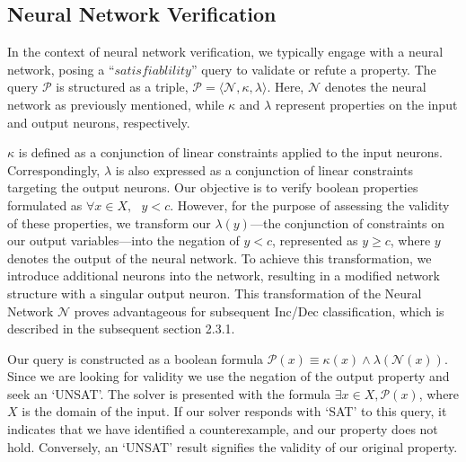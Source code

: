 \subsection{Neural Network Verification }
In the context of neural network verification, we typically engage with a
 neural network, posing a ``$\textit{satisfiablility}$'' query to validate or 
 refute a property. The query \(\mathcal{P}\) is structured as a triple,
  \(\mathcal{P} = \langle \mathcal{N}, \kappa, \lambda \rangle\). Here,
   \(\mathcal{N}\) denotes the neural network as previously mentioned, 
   while \(\kappa\) and \(\lambda\) represent properties on the input and 
   output neurons, respectively. 

$\kappa$ is defined as a conjunction of linear constraints applied to the 
input neurons. Correspondingly, $\lambda$ is also expressed as a conjunction 
of linear constraints targeting the output neurons. Our objective is to verify
boolean properties formulated as $\forall x \in X,\textit{ } y < c$. However, 
for the purpose of assessing the validity of these properties, we transform 
our $\lambda(y)$—the conjunction of constraints on our output variables—into
the negation of $y < c$, represented as $y \geq c$, where $y$ denotes the output 
of the neural network. To achieve this transformation, we introduce additional
neurons into the network, resulting in a modified network structure with a singular
output neuron. This transformation of the Neural Network $\mathcal{N}$ proves 
advantageous for subsequent Inc/Dec classification, which is described in the
subsequent section 2.3.1.

Our query is constructed as a boolean formula 
\(\mathcal{P}(x) \equiv \kappa(x) \land \lambda(\mathcal{N}(x))\). 
Since we are looking for validity we use the negation of the output 
property and seek an `UNSAT'. The solver is presented with the formula 
\(\exists x \in X, \mathcal{P}(x)\), where \(X\) is the domain of the input. 
If our solver responds with `SAT' to this query, it indicates that we have 
identified a counterexample, and our property does not hold. Conversely, an
 `UNSAT' result signifies the validity of our original property.


